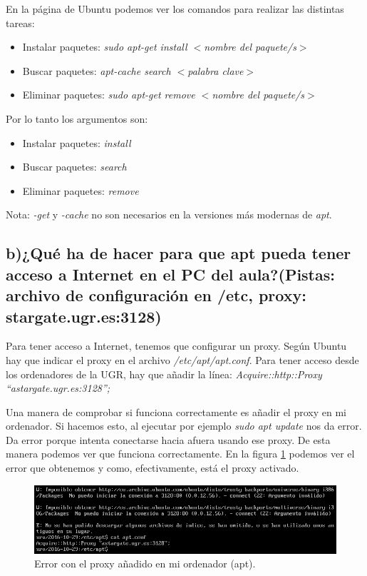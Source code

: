 \documentclass[a4paper,titlepage,12pt]{scrartcl}	%
\numberwithin{figure}{section} %
\numberwithin{table}{section} %
\begin{document}
	En la página de Ubuntu \cite{apt} podemos ver los comandos para realizar las distintas tareas:
	\begin{itemize}
		\item Instalar paquetes: \textit{sudo apt-get install $<$nombre del paquete/s$>$}
		\item Buscar paquetes: \textit{apt-cache search $<$palabra clave$>$}
		\item Eliminar paquetes: \textit{sudo apt-get remove $<$nombre del paquete/s$>$}
	\end{itemize}
	
	Por lo tanto los argumentos son:
	\begin{itemize}
		\item Instalar paquetes: \textit{install}
		\item Buscar paquetes: \textit{search}
		\item Eliminar paquetes: \textit{remove}
	\end{itemize} 
	
	Nota: \textit{-get} y \textit{-cache} no son necesarios en la versiones más modernas de \textit{apt}.
	
	\subsection[b)¿Qué ha de hacer para que apt pueda tener acceso a Internet en el PC del aula?(Pistas: archivo de configuración en /etc, proxy: stargate.ugr.es:3128)]{b)¿Qué ha de hacer para que apt pueda tener acceso a Internet en el PC del aula?(Pistas: archivo de configuración en /etc, proxy: stargate.ugr.es:3128)}
	
	Para tener acceso a Internet, tenemos que configurar un proxy. Según Ubuntu \cite{apt} hay que indicar el proxy en el archivo \textit{/etc/apt/apt.conf}. Para tener acceso desde los ordenadores de la UGR, hay que añadir la línea: \textit{Acquire::http::Proxy ``astargate.ugr.es:3128'';}
	
	Una manera de comprobar si funciona correctamente es añadir el proxy en mi ordenador. Si hacemos esto, al ejecutar por ejemplo \textit{sudo apt update} nos da error. Da error porque intenta conectarse hacia afuera usando ese proxy. De esta manera podemos ver que funciona correctamente. En la figura \ref{2-apt-proxy} podemos ver el error que obtenemos y como, efectivamente, está el proxy activado.
	
	\begin{figure}[H]
		\includegraphics[width=\linewidth]{./Imagenes/2-apt-proxy.png}
		\vspace{-0.5cm}
		\caption[Error con el proxy añadido en mi ordenador (apt).]{Error con el proxy añadido en mi ordenador (apt).}
		\label{2-apt-proxy}
	\end{figure}
	
\end{document}
